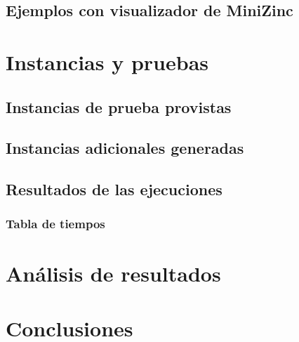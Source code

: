 \subsection{Ejemplos con visualizador de MiniZinc}

\section{Instancias y pruebas}

\subsection{Instancias de prueba provistas}

\subsection{Instancias adicionales generadas}

\subsection{Resultados de las ejecuciones}

\subsubsection{Tabla de tiempos}


\section{Análisis de resultados}

\section{Conclusiones}


